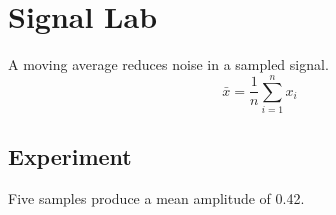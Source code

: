 \documentclass{article}
\begin{document}
\section*{Signal Lab}
A moving average reduces noise in a sampled signal.
\[\bar{x} = \frac{1}{n}\sum_{i=1}^{n}x_i\]
\subsection*{Experiment}
Five samples produce a mean amplitude of 0.42.
\end{document}
